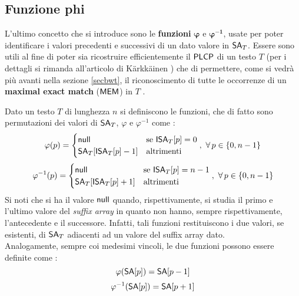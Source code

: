 \subsection{Funzione phi}
L'ultimo concetto che si introduce sono le \textbf{funzioni}
$\boldsymbol\varphi$ e $\mathbf{\boldsymbol\varphi^{-1}}$, usate per poter
identificare i valori precedenti e successivi di 
un dato valore in $\mbox{\rm {\sf SA}}_T$. Essere sono utili al fine di poter sia ricostruire
efficientemente il $\mbox{\rm {\sf PLCP}}$ di un testo $T$ (per i dettagli si rimanda
all'articolo di K\"{a}rkk\"{a}inen \cite{plcp}) che di permettere, come si vedrà
più  avanti nella sezione \ref{secbwt}, il riconoscimento di tutte le occorrenze
di un \textbf{maximal exact match} ($\mbox{\rm {\sf MEM}}$) in $T$ \cite{phoni}.
\begin{definizione}
  Dato un testo $T$ di lunghezza $n$ si definiscono le funzioni, che di fatto
  sono permutazioni dei valori di $\mbox{\rm {\sf SA}}_T$, $\varphi$ e
  $\varphi^{-1}$ come \cite{phoni}: 
  \begin{equation}
    \label{eq:phidef1}
    \varphi(p)=
    \begin{cases}
      \mbox{\rm {\sf null}}&\mbox{se } \mbox{\rm {\sf ISA}}_T[p]=0\\
      \mbox{\rm {\sf SA}}_T[\mbox{\rm {\sf ISA}}_T[p]-1]&\mbox{altrimenti}
    \end{cases},\,\,\forall\, p\in\{0,n-1\}
  \end{equation}
  \begin{equation}
    \label{eq:phiinvdef1}
    \varphi^{-1}(p)=
    \begin{cases}
      \mbox{\rm {\sf null}}&\mbox{se } \mbox{\rm {\sf ISA}}_T[p]=n-1\\
      \mbox{\rm {\sf SA}}_T[\mbox{\rm {\sf ISA}}_T[p]+1]&\mbox{altrimenti}
    \end{cases},\,\,\forall\, p\in\{0,n-1\}
  \end{equation}
  Si noti che si ha il valore $\mbox{\rm {\sf null}}$ quando, rispettivamente, si studia il
  primo e l'ultimo valore del \textit{suffix array} in quanto non hanno, sempre
  rispettivamente, l'antecedente e il successore. Infatti, tali
  funzioni restituiscono i due valori, se 
  esistenti, di $\mbox{\rm {\sf SA}}_T$ adiacenti ad un valore del suffix array dato.\\
  Analogamente, sempre coi medesimi vincoli, le due funzioni possono essere
  definite come \cite{plcp}: 
  \begin{equation}
    \label{eq:phidef2}
    \varphi(\mbox{\rm {\sf SA}}[p])=\mbox{\rm {\sf SA}}[p-1]
  \end{equation}
  \begin{equation}
    \label{eq:phiinvdef2}
    \varphi^{-1}(\mbox{\rm {\sf SA}}[p])=\mbox{\rm {\sf SA}}[p+1]
  \end{equation}

\end{definizione}
